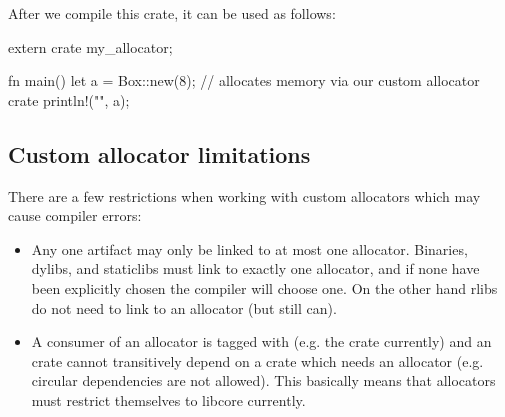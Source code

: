 After we compile this crate, it can be used as follows:

\begin{rustc}
extern crate my_allocator;

fn main() {
    let a = Box::new(8); // allocates memory via our custom allocator crate
    println!("{}", a);
}
\end{rustc}

\subsection*{Custom allocator limitations}

There are a few restrictions when working with custom allocators which may cause compiler errors:

\begin{itemize}
  \item{Any one artifact may only be linked to at most one allocator. Binaries, dylibs, and staticlibs must link to exactly one 
      allocator, and if none have been explicitly chosen the compiler will choose one. On the other hand rlibs do not need to 
      link to an allocator (but still can).}
  \item{A consumer of an allocator is tagged with  (e.g. the  crate currently) and 
      an \code{\#[allocator]} crate cannot transitively depend on a crate which needs an allocator (e.g. circular dependencies 
      are not allowed). This basically means that allocators must restrict themselves to libcore currently.}
\end{itemize}
